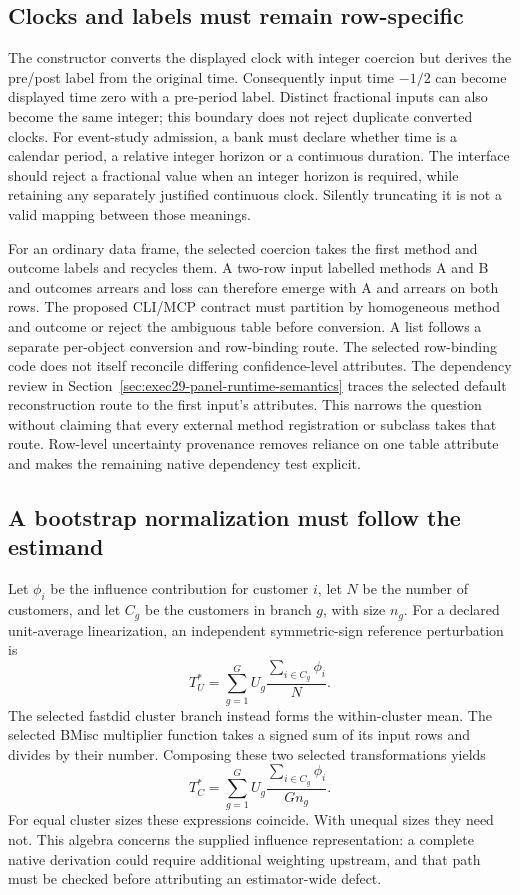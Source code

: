\subsection{Clocks and labels must remain row-specific}

The constructor converts the displayed clock with integer coercion but derives the pre/post label from the original time. Consequently input time $-1/2$ can become displayed time zero with a pre-period label. Distinct fractional inputs can also become the same integer; this boundary does not reject duplicate converted clocks. For event-study admission, a bank must declare whether time is a calendar period, a relative integer horizon or a continuous duration. The interface should reject a fractional value when an integer horizon is required, while retaining any separately justified continuous clock. Silently truncating it is not a valid mapping between those meanings.~\citep{exec29_panel_inference_sources,exec29_panel_inference_reference}

For an ordinary data frame, the selected coercion takes the first method and outcome labels and recycles them. A two-row input labelled methods A and B and outcomes arrears and loss can therefore emerge with A and arrears on both rows. The proposed CLI/MCP contract must partition by homogeneous method and outcome or reject the ambiguous table before conversion. A list follows a separate per-object conversion and row-binding route. The selected row-binding code does not itself reconcile differing confidence-level attributes. The dependency review in Section~\ref{sec:exec29-panel-runtime-semantics} traces the selected default reconstruction route to the first input's attributes. This narrows the question without claiming that every external method registration or subclass takes that route. Row-level uncertainty provenance removes reliance on one table attribute and makes the remaining native dependency test explicit.~\citep{exec29_panel_inference_sources,exec29_panel_inference_reference}

\subsection{A bootstrap normalization must follow the estimand}

Let $\phi_i$ be the influence contribution for customer $i$, let $N$ be the number of customers, and let $C_g$ be the customers in branch $g$, with size $n_g$. For a declared unit-average linearization, an independent symmetric-sign reference perturbation is
\[
 T_U^*=\sum_{g=1}^{G}U_g\frac{\sum_{i\in C_g}\phi_i}{N}.
\]
The selected fastdid cluster branch instead forms the within-cluster mean. The selected BMisc multiplier function takes a signed sum of its input rows and divides by their number. Composing these two selected transformations yields
\[
 T_C^*=\sum_{g=1}^{G}U_g\frac{\sum_{i\in C_g}\phi_i}{G n_g}.
\]
For equal cluster sizes these expressions coincide. With unequal sizes they need not. This algebra concerns the supplied influence representation: a complete native derivation could require additional weighting upstream, and that path must be checked before attributing an estimator-wide defect.~\citep{exec28_panel_delegates,exec29_panel_inference_sources}

